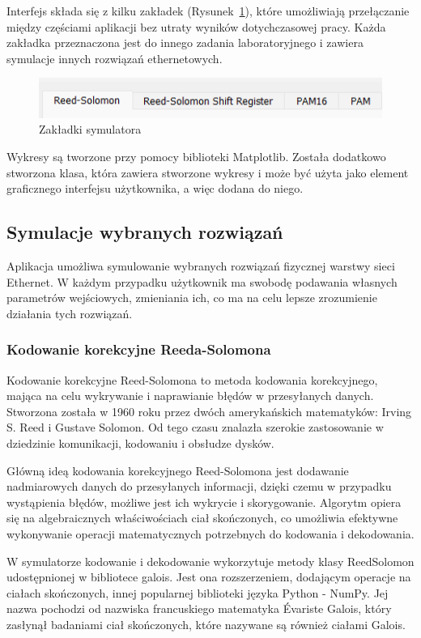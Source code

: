 Interfejs składa się z kilku zakładek (Rysunek~\ref{fig:zakladki_sim_image}), które umożliwiają przełączanie między częściami aplikacji bez utraty wyników dotychczasowej pracy. Każda zakładka przeznaczona jest do innego zadania laboratoryjnego i zawiera symulacje innych rozwiązań ethernetowych.

\begin{figure}[H]
    \centering
    \includegraphics{images/zakladki.png}
    \caption{Zakładki symulatora}
    \label{fig:zakladki_sim_image}
\end{figure}

Wykresy są tworzone przy pomocy biblioteki Matplotlib. Została dodatkowo stworzona klasa, która zawiera stworzone wykresy i może być użyta jako element graficznego interfejsu użytkownika, a więc dodana do niego.

\subsection{Symulacje wybranych rozwiązań}
Aplikacja umożliwa symulowanie wybranych rozwiązań fizycznej warstwy sieci Ethernet. W każdym przypadku użytkownik ma swobodę podawania własnych parametrów wejściowych, zmieniania ich, co ma na celu lepsze zrozumienie działania tych rozwiązań.

\subsubsection{Kodowanie korekcyjne Reeda-Solomona}
Kodowanie korekcyjne Reed-Solomona to metoda kodowania korekcyjnego, mająca na celu wykrywanie i naprawianie błędów w przesyłanych danych. Stworzona została w 1960 roku przez dwóch amerykańskich matematyków: Irving S. Reed i Gustave Solomon. Od tego czasu znalazła szerokie zastosowanie w dziedzinie komunikacji, kodowaniu i obsłudze dysków.

Główną ideą kodowania korekcyjnego Reed-Solomona jest dodawanie nadmiarowych danych do przesyłanych informacji, dzięki czemu w przypadku wystąpienia błędów, możliwe jest ich wykrycie i skorygowanie. Algorytm opiera się na algebraicznych właściwościach ciał skończonych, co umożliwia efektywne wykonywanie operacji matematycznych potrzebnych do kodowania i dekodowania.

W symulatorze kodowanie i dekodowanie wykorzytuje metody klasy ReedSolomon udostępnionej w bibliotece galois. Jest ona rozszerzeniem, dodającym operacje na ciałach skończonych, innej popularnej biblioteki języka Python - NumPy. Jej nazwa pochodzi od nazwiska francuskiego matematyka Évariste Galois, który zasłynął badaniami ciał skończonych, które nazywane są również ciałami Galois.

